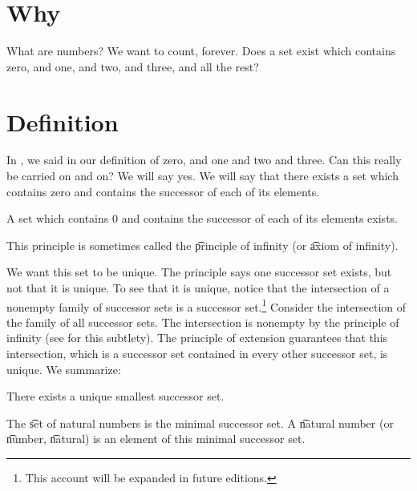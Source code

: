 

\section*{Why}

What are numbers?
We want to count, forever.
Does a set exist which contains zero, and one, and two, and three, and all the rest?

\section*{Definition}

In , we said  in our definition of zero, and one and two and three.
Can this really be carried on and on?
We will say yes.
We will say that there exists a set which contains zero and contains the successor of each of its elements.

\begin{principle}
A set which contains 0 and contains the successor of each of its elements exists.\end{principle}
This principle is sometimes called the \t{principle of infinity} (or \t{axiom of infinity}).

We want this set to be unique.
The principle says one successor set exists, but not that it is unique.
To see that it is unique, notice that the intersection of a nonempty family of successor sets is a successor set.\footnote{This account will be expanded in future editions.}
Consider the intersection of the family of all successor sets.
The intersection is nonempty by the principle of infinity (see for this subtlety).
The principle of extension guarantees that this intersection, which is a successor set contained in every other successor set, is unique.
We summarize:

\begin{proposition}

\label{natural_numbers:proposition:omega}There exists a unique smallest successor set.\end{proposition}
The \t{set of natural numbers} is the minimal successor set.
A \t{natural number} (or \t{number}, \t{natural}) is an element of this minimal successor set.

